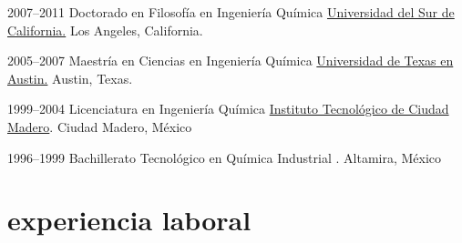 \documentclass[]{friggeri-cv} %
\begin{document}
\begin{entrylist}


\entry
{2007--2011}
{Doctorado en Filosofía {\normalfont en Ingeniería Química}}
{\flushright \href{http://chems.usc.edu}{Universidad del Sur de California.} Los Angeles, California.}


\entry
{2005--2007}
{Maestría en Ciencias {\normalfont en Ingeniería Química}}
{\flushright \href{http://www.che.utexas.edu/}{Universidad de Texas en Austin.}
Austin, Texas.}


\entry
{1999--2004}
{Licenciatura {\normalfont en Ingeniería Química}}
{\flushright \href{http://www.itcm.edu.mx/}{Instituto Tecnológico de Ciudad Madero}.
Ciudad Madero, México}

\entry
{1996--1999}
{Bachillerato Tecnológico {\normalfont en Química Industrial}}
{.
Altamira, México}


\end{entrylist}



\section{experiencia laboral}
\end{document}

